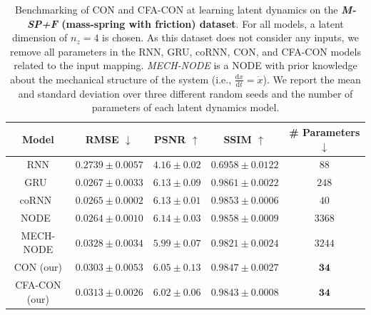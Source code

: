 \begin{table}[ht]
    \centering
    \begin{small}
    \begin{tabular}{c c c c c}
         \toprule
         \textbf{Model} & \textbf{RMSE} $\downarrow$ & \textbf{PSNR} $\uparrow$ & \textbf{SSIM} $\uparrow$ & \textbf{\# Parameters} $\downarrow$ \\
         \midrule
         RNN & $0.2739 \pm 0.0057$ & $4.16 \pm 0.02$ & $0.6958 \pm 0.0122$ & $88$\\
         GRU~\cite{cho2014learning} & $0.0267 \pm 0.0033$ & $\mathbf{6.13 \pm 0.09}$ & $0.9861 \pm 0.0022$ & $248$\\
         coRNN~\cite{rusch2020coupled} & $\mathbf{0.0265 \pm 0.0002}$ & $\mathbf{6.13 \pm 0.01}$ & $\mathbf{0.9853 \pm 0.0006}$ & $40$\\
         NODE~\cite{chen2018neural} & $\mathbf{0.0264 \pm 0.0010}$ & $\mathbf{6.14 \pm 0.03}$ & $\mathbf{0.9858 \pm 0.0009}$ & $3368$\\
         MECH-NODE & $0.0328 \pm 0.0034$ & $5.99 \pm 0.07$ & $0.9821 \pm 0.0024$ & $3244$\\
         CON (our) & $0.0303 \pm 0.0053$ & $6.05 \pm 0.13$ & $0.9847 \pm 0.0027$ & $\mathbf{34}$\\
         CFA-CON (our) & $0.0313 \pm 0.0026$ & $6.02 \pm 0.06$ & $0.9843 \pm 0.0008$ & $\mathbf{34}$\\
         \bottomrule
    \end{tabular}
    \end{small}
    \vspace{0.5cm}
    \caption{Benchmarking of \gls{CON} and \gls{CFA-CON} at learning latent dynamics on the \textbf{\emph{M-SP+F} (mass-spring with friction) dataset}. For all models, a latent dimension of $n_z=4$ is chosen.
    As this dataset does not consider any inputs, we remove all parameters in the RNN, GRU, coRNN, CON, and CFA-CON models related to the input mapping.
    \emph{MECH-NODE} is a \gls{NODE} with prior knowledge about the mechanical structure of the system (i.e., $\frac{\mathrm{d}x}{\mathrm{d}t} = \dot{x}$). We report the mean and standard deviation over three different random seeds and the number of parameters of each latent dynamics model.
    }
    \label{tab:apx-con:latent_dynamics_results:m_sp_f}
\end{table}


